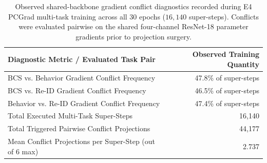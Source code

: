 \begin{table}[htbp]
\centering\small
\caption[PCGrad shared-backbone gradient conflict diagnostics]{Observed shared-backbone gradient conflict diagnostics recorded during E4 PCGrad multi-task training across all 30 epochs ($16{,}140$ super-steps). Conflicts were evaluated pairwise on the shared four-channel ResNet-18 parameter gradients prior to projection surgery.}
\label{tab:pcgrad_diagnostics}
\begin{tabularx}{\textwidth}{Xr}
\toprule
\textbf{Diagnostic Metric / Evaluated Task Pair} & \textbf{Observed Training Quantity} \\
\midrule
BCS vs. Behavior Gradient Conflict Frequency & 47.8\% of super-steps \\
BCS vs. Re-ID Gradient Conflict Frequency & 46.5\% of super-steps \\
Behavior vs. Re-ID Gradient Conflict Frequency & 47.4\% of super-steps \\
\midrule
Total Executed Multi-Task Super-Steps & 16,140 \\
Total Triggered Pairwise Conflict Projections & 44,177 \\
Mean Conflict Projections per Super-Step (out of 6 max) & 2.737 \\
\bottomrule
\end{tabularx}
\end{table}
